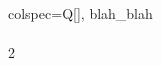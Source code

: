 \begin{table}
\centering
\begin{tblr}[         %
]                     %
{                     %
colspec={Q[]},
}                     %
\toprule
blah\_blah \\  \\
2 \\
\bottomrule
\end{tblr}
\end{table} 
